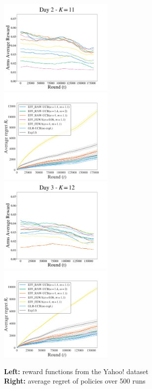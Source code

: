  \begin{figure}[p!]
\caption{\textbf{Left:} reward functions from the Yahoo! dataset \\ \textbf{Right:} average regret of policies over 500 runs}
\label{fig:restless-exp}
\includegraphics[clip, width= 0.495\textwidth]{2.2Restless/fig/reward_plot_day2.pdf}
\includegraphics[clip, width= 0.495\textwidth]{2.2Restless/fig/DAY2.pdf}
\includegraphics[clip, width= 0.495\textwidth]{2.2Restless/fig/reward_plot_day3.pdf}
\includegraphics[clip, width= 0.495\textwidth]{2.2Restless/fig/DAY3.pdf}

\end{figure}
